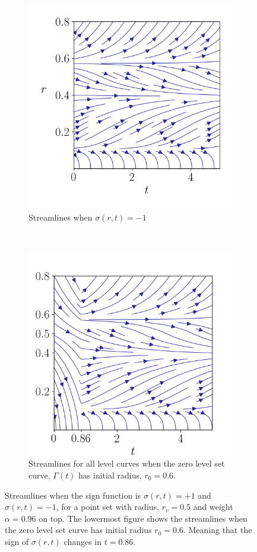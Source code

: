 \begin{figure}
\begin{subfigure}{.5\linewidth}
        \includegraphics[width=\linewidth]{figures/streamlines/mod1-a96-neg.png}
        \caption{Streamlines when $\sigma(r, t)=-1$}
        \label{fig:sub2}
        \end{subfigure}\\[1ex]
    \begin{subfigure}{\linewidth}
        \centering
        \includegraphics[width=.5\linewidth]{figures/streamlines/mod1-a96-tot.png}
        \caption{Streamlines for all level curves when the zero level set curve, $\Gamma (t)$ has initial radius, $r_0=0.6$.}
        \label{fig:sub3}
    \end{subfigure}
    \caption[Streamlines for all level curves]{Streamlines when the sign function is $\sigma(r, t) = +1$ and $\sigma(r, t) = -1$, for a point set with radius, $r_v=0.5$ and weight $\alpha=0.96$ on top. The lowermost figure shows the streamlines when the zero level set curve has initial radius $r_0=0.6$. Meaning that the sign of $\sigma(r, t)$ changes in $t=0.86$.}
    \label{fig:total-streamline-picture}
\end{figure}

